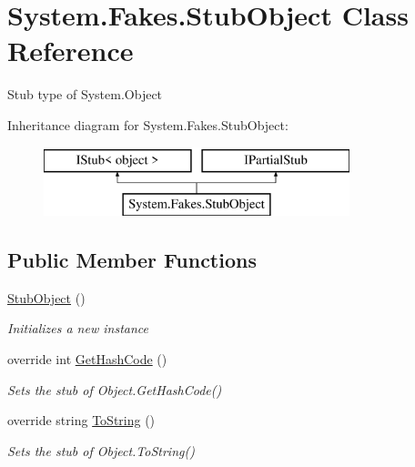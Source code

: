 \hypertarget{class_system_1_1_fakes_1_1_stub_object}{\section{System.\-Fakes.\-Stub\-Object Class Reference}
\label{class_system_1_1_fakes_1_1_stub_object}
}


Stub type of System.\-Object 


Inheritance diagram for System.\-Fakes.\-Stub\-Object\-:\begin{figure}[H]
\begin{center}
\leavevmode
\includegraphics[height=2.000000cm]{class_system_1_1_fakes_1_1_stub_object}
\end{center}
\end{figure}
\subsection*{Public Member Functions}
\begin{DoxyCompactItemize}
\item 
\hyperlink{class_system_1_1_fakes_1_1_stub_object_a22a9ec3e0cfc038b6d1dbbe1693e932e}{Stub\-Object} ()
\begin{DoxyCompactList}\small\item\em Initializes a new instance\end{DoxyCompactList}\item 
override int \hyperlink{class_system_1_1_fakes_1_1_stub_object_a88d25624ea186cde77da3a5464a8217e}{Get\-Hash\-Code} ()
\begin{DoxyCompactList}\small\item\em Sets the stub of Object.\-Get\-Hash\-Code()\end{DoxyCompactList}\item 
override string \hyperlink{class_system_1_1_fakes_1_1_stub_object_a6fca8e14a212027a52be8882980c2a13}{To\-String} ()
\begin{DoxyCompactList}\small\item\em Sets the stub of Object.\-To\-String()\end{DoxyCompactList}\end{DoxyCompactItemize}
